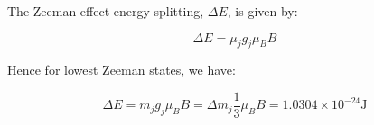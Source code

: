 \documentclass[11pt]{article}
\begin{document}
  The Zeeman effect energy splitting, $\Delta E$, is given by:  

  \begin{equation}
    \Delta E = \mu_j g_j \mu_B B
  \end{equation}

  Hence for lowest Zeeman states, we have:

  \begin{equation}
    \Delta E = m_j g_j \mu_B B = \Delta m_j \frac{1}{3} \mu_B B = 1.0304 \times 10^{-24} \text{J}
  \end{equation}


  

  
\end{document}
